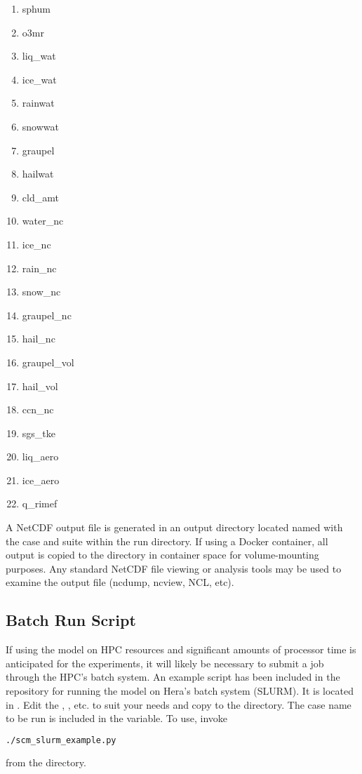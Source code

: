\begin{enumerate}
\item sphum
\item o3mr
\item liq\_wat
\item ice\_wat
\item rainwat
\item snowwat
\item graupel
\item hailwat
\item cld\_amt
\item water\_nc
\item ice\_nc
\item rain\_nc
\item snow\_nc
\item graupel\_nc
\item hail\_nc
\item graupel\_vol
\item hail\_vol
\item ccn\_nc
\item sgs\_tke
\item liq\_aero
\item ice\_aero
\item q\_rimef
\end{enumerate}

A NetCDF output file is generated in an output directory located named with the case and suite within the run directory. If using a Docker container, all output is copied to the  directory in container space for volume-mounting purposes. Any standard NetCDF file viewing or analysis tools may be used to
examine the output file (ncdump, ncview, NCL, etc).

\subsection{Batch Run Script}

If using the model on HPC resources and significant amounts of processor time is anticipated for the experiments, it will likely be necessary to submit a job through the HPC's batch system. An example script has been included in the repository for running the model on Hera's batch system (SLURM). It is located in . Edit the , , etc. to suit your needs and copy to the  directory. The case name to be run is included in the  variable. To use, invoke
\begin{lstlisting}[language=bash]
./scm_slurm_example.py
\end{lstlisting}
from the  directory.

